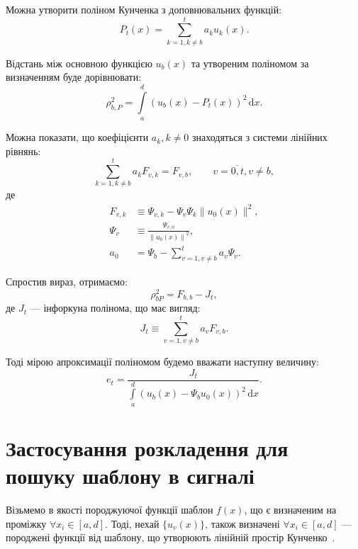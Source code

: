     Можна утворити поліном Кунченка з доповнювальних функцій:
    \begin{equation}
        \label{eq:polynom}
        P_t( x ) = \sum^t_{k = 1, k \ne b} a_k u_k( x  ).
    \end{equation}

    Відстань між основною функцією $u_b(x)$ та утвореним поліномом за визначенням буде дорівнювати:
    \begin{equation}
        \rho^2_{b,P} = \int\limits_a^d\left( u_b(x) - P_t(x)\right)^2 \,\mathrm{d}x.
    \end{equation}

    Можна показати, що коефіцієнти $a_k, k \ne 0$ знаходяться з системи лінійних рівнянь:
    \begin{equation}
        \label{eq:linear-system}
        \sum^t_{k=1,k\ne b} a_k F_{v,k} = F_{v,b},\qquad v=\overline{0,t}, v \ne b,
    \end{equation}
    де
    \begin{align}
        \label{eq:centered-correlants}
        F_{v,k} &\equiv \Psi_{v,k} - \Psi_v \Psi_k \| u_0( x ) \|^2,\\
        \Psi_v &\equiv \frac{\Psi_{v,0}}{\left\|u_0(x)\right\|^2},\\
        a_0 &= \Psi_b - \sum\limits_{v=1, v \ne b}^t{a_v \Psi_v}.
    \end{align}

    Спростив вираз, отримаємо:
    \begin{equation}
        \rho^2_{bP} = F_{b,b} - J_t,
    \end{equation}
    де $J_t$ --- інфоркуна полінома, що має вигляд:
    \begin{equation}
        J_t \equiv \sum_{v=1,v\ne b}^t a_v F_{v,b}.
    \end{equation}

    Тоді мірою апроксимації поліномом будемо вважати наступну величину:
    \begin{equation}
        \label{eq:et}
        e_t = \frac{J_t}{\int\limits_a^d (u_b(x)-\Psi_b u_0( x ))^2\, \mathrm{d}x}.
    \end{equation}

\section{Застосування розкладення для пошуку шаблону в сигналі}
    Візьмемо в якості породжуючої функції шаблон $f(x)$, що є визначеним на проміжку $\forall x_i \in {[a, d]}$.
    Тоді, нехай $\{u_v(x)\}$, також визначені $\forall x_i \in {[a, d]}$ --- породжені функції від шаблону, що
    утворюють лінійній простір Кунченко~\cite{book7}.

